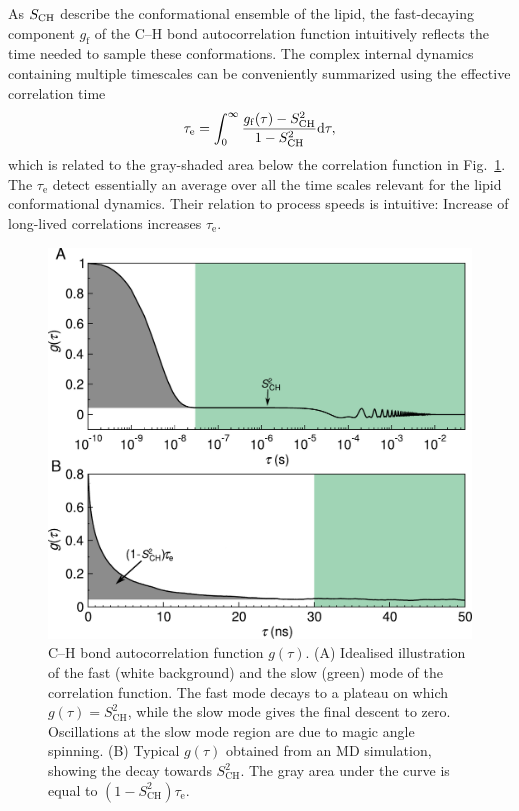 \documentclass[journal=jcisd8,manuscript=article,layout=twocolumn]{achemso}
\begin{document}
As $S_{\rm{CH}}$ describe the conformational ensemble of the lipid, the fast-decaying component $g_\mathrm f$ of the C--H bond autocorrelation function intuitively reflects the time needed to sample these conformations.
The complex internal dynamics containing multiple timescales can be conveniently summarized using the effective correlation time
\begin{equation}
\label{eq:teff}
\tau_\mathrm{e}=\int_{0}^{\infty}\frac{g_{\mathrm{f}}(\tau)-S^{2}_{\rm{CH}}}{1-S^2_{\mathrm{CH}}}\mathrm d\tau,
\end{equation}
which is related to the gray-shaded area below the correlation function in Fig.~\ref{fig:schem_teff}.
The $\tau_\mathrm{e}$ detect essentially an average over all the time scales relevant for the lipid conformational dynamics.
Their relation to process speeds is intuitive: Increase of long-lived correlations increases $\tau_\mathrm{e}$.

\begin{figure}[t]
\includegraphics[scale=0.45]{../Figs/gfun_draft.pdf} 
\caption{C--H bond autocorrelation function $g(\tau)$. (A) Idealised illustration of the fast (white background) and the slow (green) mode of the correlation function. The fast mode decays to a plateau on which $g(\tau)=S^2_{\mathrm{CH}}$, while the slow mode gives the final descent to zero. Oscillations at the slow mode region are due to magic angle spinning. (B) Typical $g(\tau)$ obtained from an MD simulation, showing the decay towards $S^2_{\mathrm{CH}}$. The gray area under the curve is equal to $(1-S^2_{\mathrm{CH}})\tau_\mathrm{e}$. }
\label{fig:schem_teff}
\end{figure} 
\end{document}
